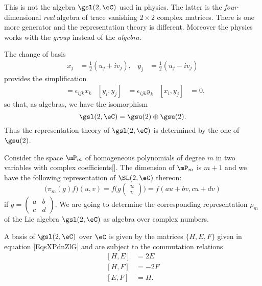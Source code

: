 \begin{remark}
    This is not the algebra \( \gsl(2,\eC)\) used in physics. The latter is the \emph{four}-dimensional \emph{real} algebra of trace vanishing \( 2\times 2\) complex matrices. There is one more generator and the representation theory is different. Moreover the physics works with the \emph{group} instead of the \emph{algebra}.
\end{remark}

The change of basis
\begin{align}
    x_j&=\frac{ 1 }{2}(u_j+iv_j),   &y_j&=\frac{ 1 }{2}(u_j-iv_j)
\end{align}
provides the simplification
\begin{align}
[x_i,x_j]&=\epsilon_{ijk}x_k    &[y_i,y_j]&=\epsilon_{ijk}y_k   &[x_i,y_j]&=0,
\end{align}
so that, as algebras, we have the isomorphism
\begin{equation}
    \gsl(2,\eC)=\gsu(2)\oplus\gsu(2).
\end{equation}
Thus the representation theory of $\gsl(2,\eC)$ is determined by the one of $\gsu(2)$.


Consider the space $\mP_m$ of homogeneous polynomials of degree $m$ in two variables with complex coefficients[\cite{GpAlgLie_Faraut}]. The dimension of $\mP_m$ is $m+1$ and we have the following representation of $\SL(2,\eC)$ thereon:
\begin{equation}
    \big( \pi_m(g)f \big)(u,v)=f\big(
g
\begin{pmatrix}
u\\v
\end{pmatrix}
 \big)
=
f(au+bv,cu+dv)
\end{equation}
if $g=\begin{pmatrix}
  a &   b   \\
  c &   d
\end{pmatrix}$. We are going to determine the corresponding representation $\rho_m$ of the Lie algebra $\gsl(2,\eC)$ as algebra over complex numbers.

A basis of $\gsl(2,\eC)$ over $\eC$ is given by the matrices $\{ H,E,F \}$ given in equation \eqref{EqsXPdnZlG} and are subject to the commutation relations
\begin{subequations}    \label{subEqsSBhuAWx}
    \begin{align}
        [H,E]&=2E\\
        [H,F]&=-2F\\
        [E,F]&=H.
    \end{align}
\end{subequations}





